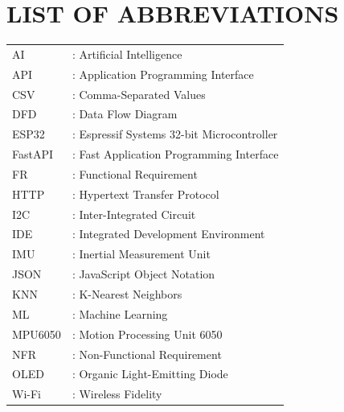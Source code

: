 \newpage
\chapter*{LIST OF ABBREVIATIONS}
\begin{tabular}{l l}
AI & : Artificial Intelligence \\
API & : Application Programming Interface \\
CSV & : Comma-Separated Values \\
DFD & : Data Flow Diagram \\
ESP32 & : Espressif Systems 32-bit Microcontroller \\
FastAPI & : Fast Application Programming Interface \\
FR & : Functional Requirement \\
HTTP & : Hypertext Transfer Protocol \\
I2C & : Inter-Integrated Circuit \\
IDE & : Integrated Development Environment \\
IMU & : Inertial Measurement Unit \\
JSON & : JavaScript Object Notation \\
KNN & : K-Nearest Neighbors \\
ML & : Machine Learning \\
MPU6050 & : Motion Processing Unit 6050 \\
NFR & : Non-Functional Requirement \\
OLED & : Organic Light-Emitting Diode \\
Wi-Fi & : Wireless Fidelity \\
\end{tabular}









